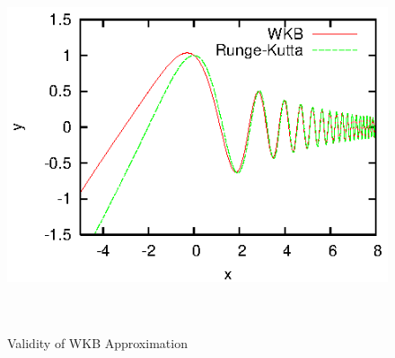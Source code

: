 \documentclass[12pt,a4paper,titlepage]{jarticle}
\begin{document}
\title{}
\author{A4SB2121 Yusa Shusaku}
\date{}

\begin{figure}[h]
\begin{center}
\includegraphics[width=160mm,height=110mm]{WKB_Approximation.eps}
\caption{Validity of WKB Approximation}
\end{center}
\end{figure}
\end{document}
